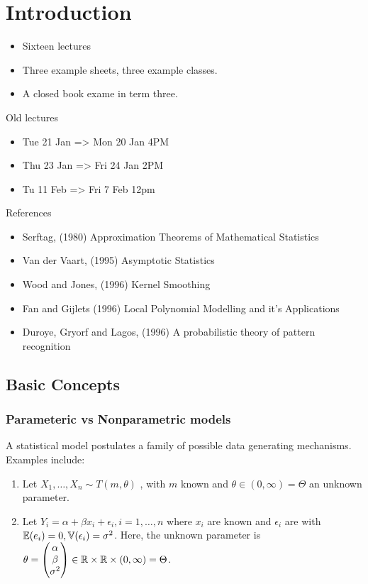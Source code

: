 
\chapter{Introduction}
\label{cha:introduction}

\begin{itemize}
\item Sixteen lectures
\item Three example sheets, three example classes.
\item A closed book exame in term three.
\end{itemize}

Old lectures
\begin{itemize}
\item Tue 21 Jan => Mon 20 Jan 4PM
\item Thu 23 Jan => Fri 24 Jan 2PM
\item  Tu 11 Feb => Fri 7 Feb 12pm
\end{itemize}

References

\begin{itemize}
\item Serftag, (1980) Approximation Theorems of Mathematical Statistics
\item Van der Vaart, (1995) Asymptotic Statistics
\item Wood and Jones, (1996) Kernel Smoothing
\item Fan and Gijlets (1996) Local Polynomial Modelling and it's Applications
\item Duroye, Gryorf and Lagos, (1996) A probabilistic theory of pattern recognition

\end{itemize}

\section{Basic Concepts}
\label{sec:basic-concepts}

\subsection{Parameteric vs Nonparametric models}
\label{sec:param-vs-nonp}

A statistical model postulates a family of possible data generating
mechanisms.  Examples include:
\begin{enumerate}
\item Let $X_{1}, \dots, X_{n} \sim T(m, \theta)$ \iid, with $m$ known
  and $\theta \in (0, \infty) = \Theta$ an unknown parameter.
\item Let $Y_{i} = \alpha + \beta x_{i}+ \epsilon_{i}, i = 1, \dots,
  n$ where $x_{i}$ are known and $\epsilon_{i}$ are \iid with
  $\E{e_{i}} = 0, \Var{\epsilon_{i}} = \sigma^{2}$.  Here, the unknown
  parameter is $\theta =
  \begin{pmatrix}
    \alpha \\
    \beta \\
    \sigma^{2}
  \end{pmatrix} \in \mathbb{R} \times \mathbb{R} \times (0, \infty) = \Theta$.
\end{enumerate}

